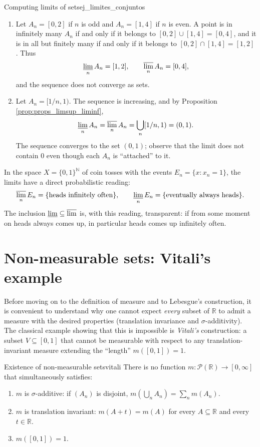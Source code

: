 \documentclass[11pt, a4paper]{article}
\begin{document}
\begin{ejemplo}{Computing limits of sets}{ej_limites_conjuntos}
\begin{enumerate}
    \item Let $A_n = [0, 2]$ if $n$ is odd and $A_n = [1, 4]$ if $n$ is even. A point is in
    infinitely many $A_n$ if and only if it belongs to $[0,2] \cup [1,4] = [0,4]$, and it is in all but
    finitely many if and only if it belongs to $[0,2] \cap [1,4] = [1,2]$. Thus
    $$ \varliminf_n A_n = [1, 2], \qquad \varlimsup_n A_n = [0, 4], $$
    and the sequence does not converge as sets.
    \item Let $A_n = [1/n, 1)$. The sequence is increasing, and by Proposition
    \ref{prop:props_limsup_liminf},
    $$ \varliminf_n A_n = \varlimsup_n A_n = \bigcup_n [1/n, 1) = (0, 1). $$
    The sequence converges to the set $(0,1)$; observe that the limit does not contain $0$
    even though each $A_n$ is ``attached'' to it.
\end{enumerate}
\end{ejemplo}

\obs In the space $X = \{0,1\}^{\mathbb{N}}$ of coin tosses with the events
$E_n = \{x : x_n = 1\}$, the limits have a direct probabilistic reading:
$$ \varlimsup_n E_n = \{\text{heads infinitely often}\}, \qquad
\varliminf_n E_n = \{\text{eventually always heads}\}. $$
The inclusion $\varliminf \subseteq \varlimsup$ is, with this reading, transparent: if from
some moment on heads always comes up, in particular heads comes up infinitely often.

\newpage

\section{Non-measurable sets: Vitali's example}

Before moving on to the definition of measure and to Lebesgue's construction, it is convenient to understand
why one cannot expect \emph{every} subset of $\mathbb{R}$ to admit a measure with the
desired properties (translation invariance and $\sigma$-additivity). The
classical example showing that this is impossible is \emph{Vitali's} construction: a subset
$V \subseteq [0, 1]$ that cannot be measurable with respect to any translation-invariant
measure extending the ``length'' $m([0, 1]) = 1$.

\begin{teorema}{Existence of non-measurable sets}{vitali}
There is no function $m: \mathcal{P}(\mathbb{R}) \to [0, \infty]$ that simultaneously satisfies:
\begin{enumerate}
    \item $m$ is $\sigma$-additive: if $(A_n)$ is disjoint, $m(\bigcup_n A_n) = \sum_n m(A_n)$.
    \item $m$ is translation invariant: $m(A + t) = m(A)$ for every $A \subseteq \mathbb{R}$
    and every $t \in \mathbb{R}$.
    \item $m([0, 1]) = 1$.
\end{enumerate}
\end{teorema}
\end{document}
